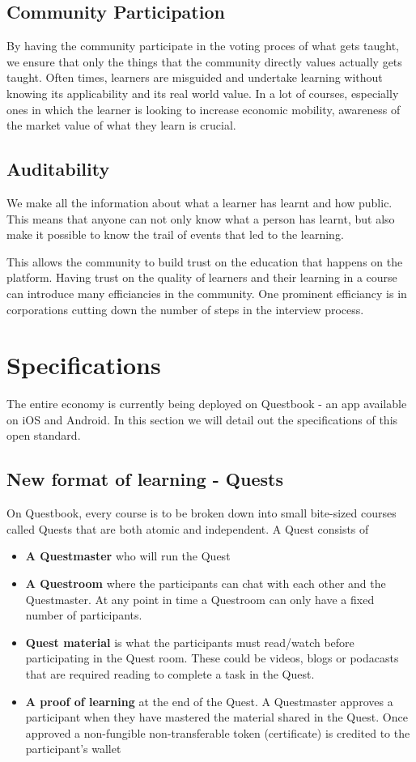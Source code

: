 \documentclass{article}
\begin{document}
    \subsection{Community Participation}
      By having the community participate in the voting proces of what gets taught, we ensure that only the things that the community directly values actually gets taught. Often times, learners are misguided and undertake learning without knowing its applicability and its real world value. In a lot of courses, especially ones in which the learner is looking to increase economic mobility, awareness of the market value of what they learn is crucial.
      \par
      
    \subsection{Auditability}
      We make all the information about what a learner has learnt and how public. This means that anyone can not only know what a person has learnt, but also make it possible to know the trail of events that led to the learning. 
      \par
      This allows the community to build trust on the education that happens on the platform.
      Having trust on the quality of learners and their learning in a course can introduce many efficiancies in the community. One prominent efficiancy is in corporations cutting down the number of steps in the interview process. \cite{lesserroundsfortopcolleges}

  \section{Specifications}
    The entire economy is currently being deployed on Questbook - an app available on iOS and Android. In this section we will detail out the specifications of this open standard.
    \subsection{New format of learning - Quests}
      On Questbook, every course is to be broken down into small bite-sized courses called Quests that are both atomic and independent.
      A Quest consists of 
      \begin{itemize}
        \item \textbf{A Questmaster} who will run the Quest
        \item \textbf{A Questroom} where the participants can chat with each other and the Questmaster. At any point in time a Questroom can only have  a fixed number of participants.
        \item \textbf{Quest material} is what the participants must read/watch before participating in the Quest room. These could be videos, blogs or podacasts that are required reading to complete a task in the Quest.
        \item \textbf{A proof of learning} at the end of the Quest. A Questmaster approves a participant when they have mastered the material shared in the Quest. Once approved a non-fungible non-transferable token (certificate) is credited to the participant's wallet
      \end{itemize}
\end{document}
